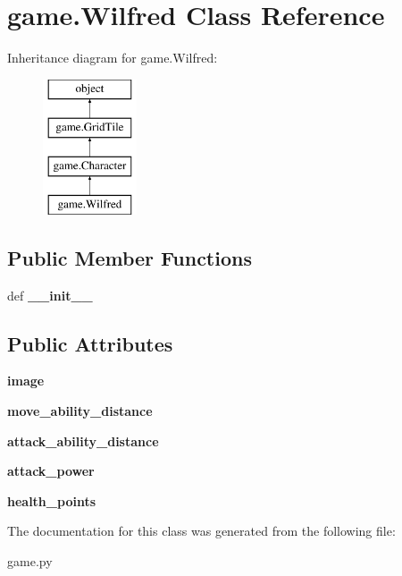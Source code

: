 \hypertarget{classgame_1_1Wilfred}{\section{game.\-Wilfred Class Reference}
\label{classgame_1_1Wilfred}
}
Inheritance diagram for game.\-Wilfred\-:\begin{figure}[H]
\begin{center}
\leavevmode
\includegraphics[height=4.000000cm]{classgame_1_1Wilfred}
\end{center}
\end{figure}
\subsection*{Public Member Functions}
\begin{DoxyCompactItemize}
\item 
\hypertarget{classgame_1_1Wilfred_ab07a2958da9b746ebb07d2f6515095a8}{def {\bfseries \-\_\-\-\_\-init\-\_\-\-\_\-}}\label{classgame_1_1Wilfred_ab07a2958da9b746ebb07d2f6515095a8}

\end{DoxyCompactItemize}
\subsection*{Public Attributes}
\begin{DoxyCompactItemize}
\item 
\hypertarget{classgame_1_1Wilfred_a8fc65d59b6ff8ed90856e78b19de2dbb}{{\bfseries image}}\label{classgame_1_1Wilfred_a8fc65d59b6ff8ed90856e78b19de2dbb}

\item 
\hypertarget{classgame_1_1Wilfred_a140998ca3f4800bb27f8b65a6a918c92}{{\bfseries move\-\_\-ability\-\_\-distance}}\label{classgame_1_1Wilfred_a140998ca3f4800bb27f8b65a6a918c92}

\item 
\hypertarget{classgame_1_1Wilfred_af85334a67807e86cece20cb929719b1f}{{\bfseries attack\-\_\-ability\-\_\-distance}}\label{classgame_1_1Wilfred_af85334a67807e86cece20cb929719b1f}

\item 
\hypertarget{classgame_1_1Wilfred_a904d6d5b9fae55d8b1f9f83f81d60907}{{\bfseries attack\-\_\-power}}\label{classgame_1_1Wilfred_a904d6d5b9fae55d8b1f9f83f81d60907}

\item 
\hypertarget{classgame_1_1Wilfred_a0e64de0f8001c025633fb20dec98bd70}{{\bfseries health\-\_\-points}}\label{classgame_1_1Wilfred_a0e64de0f8001c025633fb20dec98bd70}

\end{DoxyCompactItemize}


The documentation for this class was generated from the following file\-:\begin{DoxyCompactItemize}
\item 
game.\-py\end{DoxyCompactItemize}

